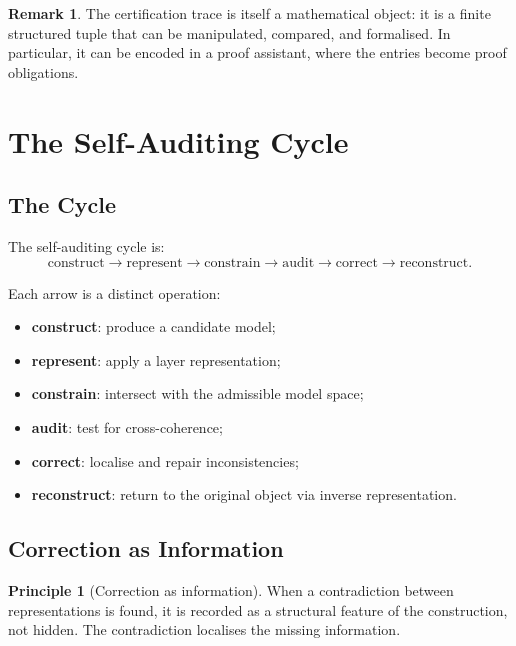 \documentclass[11pt,a4paper]{article}
\theoremstyle{definition}
\newtheorem{principle}[definition]{Principle}
\newtheorem{remark}[definition]{Remark}
\theoremstyle{plain}
\begin{document}
\begin{remark}
The certification trace is itself a mathematical object: it is a
finite structured tuple that can be manipulated, compared, and
formalised. In particular, it can be encoded in a proof assistant,
where the entries become proof obligations.
\end{remark}

\section{The Self-Auditing Cycle}
\label{sec:cycle}

\subsection{The Cycle}

The self-auditing cycle is:
\[
  \boxed{
    \text{construct}
    \to
    \text{represent}
    \to
    \text{constrain}
    \to
    \text{audit}
    \to
    \text{correct}
    \to
    \text{reconstruct}.
  }
\]

Each arrow is a distinct operation:
\begin{itemize}
  \item \textbf{construct}: produce a candidate model;
  \item \textbf{represent}: apply a layer representation;
  \item \textbf{constrain}: intersect with the admissible model space;
  \item \textbf{audit}: test for cross-coherence;
  \item \textbf{correct}: localise and repair inconsistencies;
  \item \textbf{reconstruct}: return to the original object via
        inverse representation.
\end{itemize}

\subsection{Correction as Information}

\begin{principle}[Correction as information]\label{pr:correction}
When a contradiction between representations is found, it is
recorded as a structural feature of the construction, not hidden.
The contradiction localises the missing information.
\end{principle}
\end{document}
